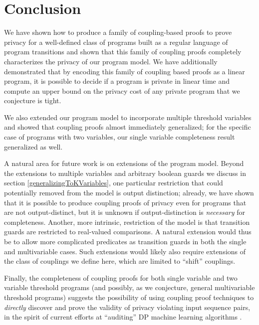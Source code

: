 

\section{Conclusion}
We have shown how to produce a family of coupling-based proofs to prove privacy for a well-defined class of programs built as a regular language of program transitions and shown that this family of coupling proofs completely characterizes the privacy of our program model. 
We have additionally demonstrated that by encoding this family of coupling based proofs as a linear program, it is possible to decide if a program is private in linear time and compute an upper bound on the privacy cost of any private program that we conjecture is tight. 

We also extended our program model to incorporate multiple threshold variables and showed that coupling proofs almost immediately generalized; for the specific case of programs with two variables, our single variable completeness result generalized as well. 

A natural area for future work is on extensions of the program model. Beyond the extensions to multiple variables and arbitrary boolean guards we discuss in section \ref{generalizingToKVariables}, one particular restriction that could potentially removed from the model is output distinction; already, we have shown that it is possible to produce coupling proofs of privacy even for programs that are not output-distinct, but it is unknown if output-distinction is \textit{necessary} for completeness.
Another, more intrinsic, restriction of the model is that transition guards are restricted to real-valued comparisons. A natural extension would thus be to allow more complicated predicates as transition guards in both the single and multivariable cases. 
Such extensions would likely also require extensions of the class of couplings we define here, which are limited to ``shift'' couplings. 

Finally, the completeness of coupling proofs for both single variable and two variable threshold programs (and possibly, as we conjecture, general multivariable threshold programs) suggests the possibility of using coupling proof techniques to \textit{directly} discover and prove the validity of privacy violating input sequence pairs, in the spirit of current efforts at ``auditing'' DP machine learning algorithms \cite{luGeneralFrameworkAuditing2022, steinkePrivacyAuditingOne2023}. 